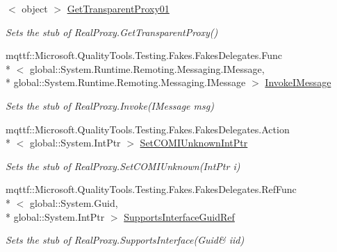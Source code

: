 \begin{DoxyCompactItemize}
$<$ object $>$ \hyperlink{class_system_1_1_runtime_1_1_remoting_1_1_proxies_1_1_fakes_1_1_stub_real_proxy_a4251c37f3fc64c563a876647edf567e7}{Get\-Transparent\-Proxy01}
\begin{DoxyCompactList}\small\item\em Sets the stub of Real\-Proxy.\-Get\-Transparent\-Proxy()\end{DoxyCompactList}\item 
mqttf\-::\-Microsoft.\-Quality\-Tools.\-Testing.\-Fakes.\-Fakes\-Delegates.\-Func\\*
$<$ global\-::\-System.\-Runtime.\-Remoting.\-Messaging.\-I\-Message, \\*
global\-::\-System.\-Runtime.\-Remoting.\-Messaging.\-I\-Message $>$ \hyperlink{class_system_1_1_runtime_1_1_remoting_1_1_proxies_1_1_fakes_1_1_stub_real_proxy_ad3484bb5396a26249861841433f6ca23}{Invoke\-I\-Message}
\begin{DoxyCompactList}\small\item\em Sets the stub of Real\-Proxy.\-Invoke(\-I\-Message msg)\end{DoxyCompactList}\item 
mqttf\-::\-Microsoft.\-Quality\-Tools.\-Testing.\-Fakes.\-Fakes\-Delegates.\-Action\\*
$<$ global\-::\-System.\-Int\-Ptr $>$ \hyperlink{class_system_1_1_runtime_1_1_remoting_1_1_proxies_1_1_fakes_1_1_stub_real_proxy_aaf4927a4ab4c713c22999a033242002e}{Set\-C\-O\-M\-I\-Unknown\-Int\-Ptr}
\begin{DoxyCompactList}\small\item\em Sets the stub of Real\-Proxy.\-Set\-C\-O\-M\-I\-Unknown(\-Int\-Ptr i)\end{DoxyCompactList}\item 
mqttf\-::\-Microsoft.\-Quality\-Tools.\-Testing.\-Fakes.\-Fakes\-Delegates.\-Ref\-Func\\*
$<$ global\-::\-System.\-Guid, \\*
global\-::\-System.\-Int\-Ptr $>$ \hyperlink{class_system_1_1_runtime_1_1_remoting_1_1_proxies_1_1_fakes_1_1_stub_real_proxy_a1f6700529baa5e3f58908d38c7db44af}{Supports\-Interface\-Guid\-Ref}
\begin{DoxyCompactList}\small\item\em Sets the stub of Real\-Proxy.\-Supports\-Interface(Guid\& iid)\end{DoxyCompactList}\end{DoxyCompactItemize}
